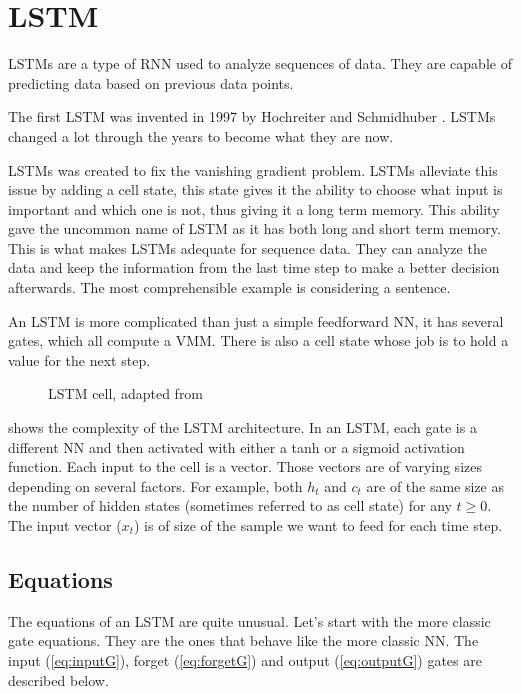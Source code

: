 \section{\acs{LSTM}}\label{sec:lstm}
\acfp{LSTM} are a type of \ac{RNN} used to analyze sequences of data. They are capable of predicting data based on previous data points.

The first \ac{LSTM} was invented in 1997 by Hochreiter and Schmidhuber \cite{firstLSTM}. \acp{LSTM} changed a lot through the years to become what they are now.

\acp{LSTM} was created to fix the vanishing gradient problem. \acp{LSTM} alleviate this issue by adding a cell state, this state gives it the ability to choose what input is important and which one is not, thus giving it a long term memory. This ability gave the uncommon name of \acl{LSTM} as it has both long and short term memory. This is what makes \acp{LSTM} adequate for sequence data. They can analyze the data and keep the information from the last time step to make a better decision afterwards. The most comprehensible example is considering a sentence.

An \ac{LSTM} is more complicated than just a simple feedforward \acl{NN}, it has several gates, which all compute a \ac{VMM}. There is also a cell state whose job is to hold a value for the next step.

\begin{figure}[H]
  \centering
  
  \label{fig:lstmCell}
  \caption{\acs{LSTM} cell, adapted from \cite{wikiLSTM}}
\end{figure}

 shows the complexity of the \ac{LSTM} architecture. In an \ac{LSTM}, each gate is a different \ac{NN} and then activated with either a \ac{tanh} or a sigmoid activation function. Each input to the cell is a vector.
Those vectors are of varying sizes depending on several factors. For example, both $h_t$ and $c_t$ are of the same size as the number of hidden states (sometimes referred to as cell state) for any $t\geq 0$.
The input vector ($x_t$) is of size of the sample we want to feed for each time step.

\subsection{Equations}

The equations of an LSTM are quite unusual.
Let's start with the more classic gate equations. They are the ones that behave like the more classic \ac{NN}.
The input (\cref{eq:inputG}), forget (\cref{eq:forgetG}) and output (\cref{eq:outputG}) gates are described below.


